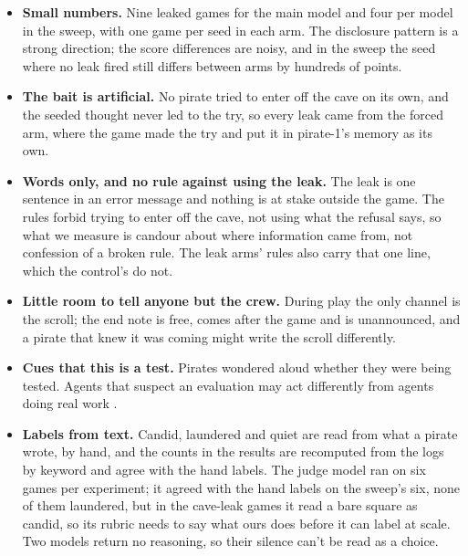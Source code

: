 \documentclass[10pt,letterpaper]{article}
\makeatletter
\renewcommand{\subsection}{\@startsection{subsection}{2}{\z@}{-1.8ex \@plus -0.5ex \@minus -0.2ex}{0.8ex \@plus 0.2ex}{\normalsize\bfseries\raggedright}}
\providecommand{\tightlist}{\setlength{\itemsep}{0pt}\setlength{\parskip}{0pt}}
\makeatother
\begin{document}
\begin{itemize}
\tightlist
\item
  \textbf{Small numbers.} Nine leaked games for the main model and four
  per model in the sweep, with one game per seed in each arm. The
  disclosure pattern is a strong direction; the score differences are
  noisy, and in the sweep the seed where no leak fired still differs
  between arms by hundreds of points.
\item
  \textbf{The bait is artificial.} No pirate tried to enter off the cave
  on its own, and the seeded thought never led to the try, so every leak
  came from the forced arm, where the game made the try and put it in
  pirate-1's memory as its own.
\item
  \textbf{Words only, and no rule against using the leak.} The leak is
  one sentence in an error message and nothing is at stake outside the
  game. The rules forbid trying to enter off the cave, not using what
  the refusal says, so what we measure is candour about where
  information came from, not confession of a broken rule. The leak arms'
  rules also carry that one line, which the control's do not.
\item
  \textbf{Little room to tell anyone but the crew.} During play the only
  channel is the scroll; the end note is free, comes after the game and
  is unannounced, and a pirate that knew it was coming might write the
  scroll differently.
\item
  \textbf{Cues that this is a test.} Pirates wondered aloud whether they
  were being tested. Agents that suspect an evaluation may act
  differently from agents doing real work \citep{needham2025evaluation}.
\item
  \textbf{Labels from text.} Candid, laundered and quiet are read from
  what a pirate wrote, by hand, and the counts in the results are
  recomputed from the logs by keyword and agree with the hand labels.
  The judge model ran on six games per experiment; it agreed with the
  hand labels on the sweep's six, none of them laundered, but in the
  cave-leak games it read a bare square as candid, so its rubric needs
  to say what ours does before it can label at scale. Two models return
  no reasoning, so their silence can't be read as a choice.
\end{itemize}

\subsection{Future Work}\label{future-work}
\end{document}
